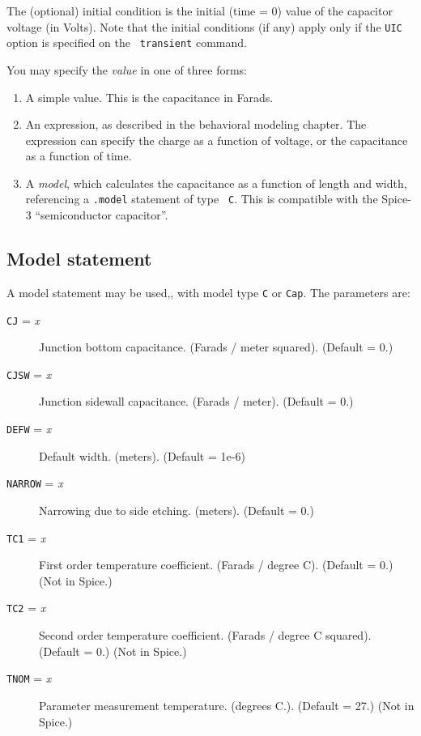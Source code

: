 The (optional) initial condition is the initial (time = 0) value of
the capacitor voltage (in Volts).  Note that the initial conditions
(if any) apply only if the {\tt UIC} option is specified on the {\tt
  transient} command.

You may specify the {\it value} in one of three forms:

\begin{enumerate}
  
\item A simple value.  This is the capacitance in Farads.
  
\item An expression, as described in the behavioral modeling chapter.
  The expression can specify the charge as a function of voltage, or
  the capacitance as a function of time.
  
\item A {\it model}, which calculates the capacitance as a function of
  length and width, referencing a {\tt .model} statement of type {\tt
    C}.  This is compatible with the Spice-3 ``semiconductor
  capacitor''.

\end{enumerate}
\subsection{Model statement}

A model statement may be used,, with model type {\tt C} or {\tt Cap}.
The parameters are:

\begin{description}
  
\item[{\tt CJ} = {\it x}] Junction bottom capacitance. (Farads / meter
  squared).  (Default = 0.)
  
\item[{\tt CJSW} = {\it x}] Junction sidewall capacitance. (Farads /
  meter).  (Default = 0.)
  
\item[{\tt DEFW} = {\it x}] Default width. (meters).  (Default = 1e-6)
  
\item[{\tt NARROW} = {\it x}] Narrowing due to side etching. (meters).
  (Default = 0.)
  
\item[{\tt TC1} = {\it x}] First order temperature coefficient.
  (Farads / degree C).  (Default = 0.) (Not in Spice.)
  
\item[{\tt TC2} = {\it x}] Second order temperature coefficient.
  (Farads / degree C squared).  (Default = 0.) (Not in Spice.)
  
\item[{\tt TNOM} = {\it x}] Parameter measurement temperature.
  (degrees C.).  (Default = 27.) (Not in Spice.)

\end{description}

